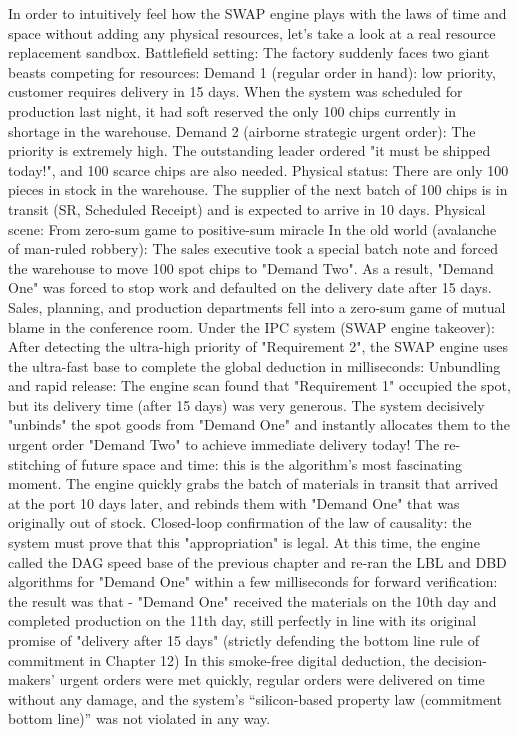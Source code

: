 \documentclass[11pt,a4paper]{article}
\begin{document}
In order to intuitively feel how the SWAP engine plays with the laws of time and space without adding any physical resources, let's take a look at a real resource replacement sandbox. Battlefield setting: The factory suddenly faces two giant beasts competing for resources: Demand 1 (regular order in hand): low priority, customer requires delivery in 15 days. When the system was scheduled for production last night, it had soft reserved the only 100 chips currently in shortage in the warehouse. Demand 2 (airborne strategic urgent order): The priority is extremely high. The outstanding leader ordered "it must be shipped today!", and 100 scarce chips are also needed. Physical status: There are only 100 pieces in stock in the warehouse. The supplier of the next batch of 100 chips is in transit (SR, Scheduled Receipt) and is expected to arrive in 10 days. Physical scene: From zero-sum game to positive-sum miracle In the old world (avalanche of man-ruled robbery): The sales executive took a special batch note and forced the warehouse to move 100 spot chips to "Demand Two". As a result, "Demand One" was forced to stop work and defaulted on the delivery date after 15 days. Sales, planning, and production departments fell into a zero-sum game of mutual blame in the conference room. Under the IPC system (SWAP engine takeover): After detecting the ultra-high priority of "Requirement 2", the SWAP engine uses the ultra-fast base to complete the global deduction in milliseconds: Unbundling and rapid release: The engine scan found that "Requirement 1" occupied the spot, but its delivery time (after 15 days) was very generous. The system decisively "unbinds" the spot goods from "Demand One" and instantly allocates them to the urgent order "Demand Two" to achieve immediate delivery today! The re-stitching of future space and time: this is the algorithm’s most fascinating moment. The engine quickly grabs the batch of materials in transit that arrived at the port 10 days later, and rebinds them with "Demand One" that was originally out of stock. Closed-loop confirmation of the law of causality: the system must prove that this "appropriation" is legal. At this time, the engine called the DAG speed base of the previous chapter and re-ran the LBL and DBD algorithms for "Demand One" within a few milliseconds for forward verification: the result was that - "Demand One" received the materials on the 10th day and completed production on the 11th day, still perfectly in line with its original promise of "delivery after 15 days" (strictly defending the bottom line rule of commitment in Chapter 12) In this smoke-free digital deduction, the decision-makers’ urgent orders were met quickly, regular orders were delivered on time without any damage, and the system’s “silicon-based property law (commitment bottom line)” was not violated in any way.
\end{document}
